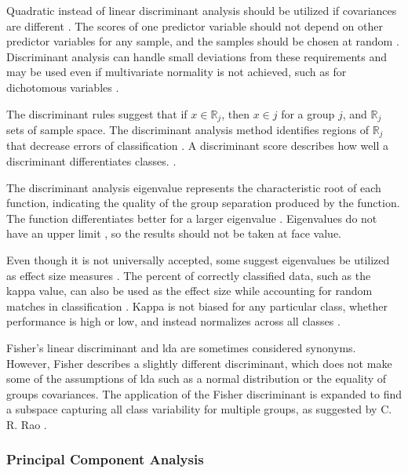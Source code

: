 \documentclass[sn-mathphys-num]{sn-jnl}%
\begin{document}
Quadratic instead of linear discriminant analysis should be utilized if covariances are different \cite{cokluk2008discriminant}. The scores of one predictor variable should not depend on other predictor variables for any sample, and the samples should be chosen at random \cite{cokluk2008discriminant, hansen2005using}. Discriminant analysis can handle small deviations from these requirements \cite{lachenbruch1979discriminant} and may be used even if multivariate normality is not achieved, such as for dichotomous variables \cite{klecka1980discriminant}.

The discriminant rules suggest that if $x\in \mathbb{R}_{j}$, then $x\in j$ for a group $j$, and $\mathbb{R}_{j}$ sets of sample space. The discriminant analysis method identifies regions of $\mathbb{R}_{j}$ that decrease errors of classification \cite{Hardle2003AppliedMS}. A discriminant score describes how well a discriminant differentiates classes. \cite{archive765Discriminant}.
 
The discriminant analysis eigenvalue represents the characteristic root of each function, indicating the quality of the group separation produced by the function. The function differentiates better for a larger eigenvalue \cite{cokluk2008discriminant}. Eigenvalues do not have an upper limit \cite{cokluk2008discriminant, hansen2005using}, so the results should not be taken at face value.

Even though it is not universally accepted, some suggest eigenvalues be utilized as effect size measures \cite{hansen2005using}. The percent of correctly classified data, such as the kappa value, can also be used as the effect size while accounting for random matches in classification \cite{hansen2005using}. Kappa is not biased for any particular class, whether performance is high or low, and instead normalizes across all classes \cite{israel2006performance}. 

Fisher's linear discriminant and \acrshort{lda} are sometimes considered synonyms. However, Fisher \cite{fisher1936use} describes a slightly different discriminant, which does not make some of the assumptions of \acrshort{lda} such as a normal distribution or the equality of groups covariances. The application of the Fisher discriminant is expanded to find a subspace capturing all class variability \cite{archive765Discriminant} for multiple groups, as suggested by C. R. Rao \cite{rao1948utilization}.

\subsubsection{Principal Component Analysis}
\end{document}
